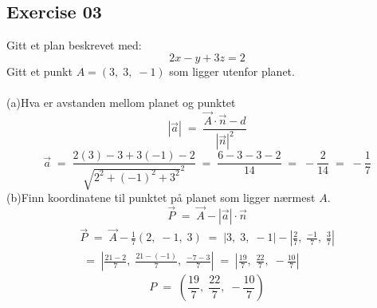 \documentclass[12pt, a4paper]{article}
\begin{document}
\newpage\quad			
\subsection*{Exercise 03}
Gitt et plan beskrevet med:
	\begin{equation}
		\tag*{}
		2x-y+3z=2
	\end{equation}
Gitt et punkt $A=(3,\;3,\;-1)$ som ligger utenfor planet.\\\\
	(a)\quad Hva er avstanden mellom planet og punktet
			\begin{equation}
				\tag*{}
					|\vec{a}|\;=\;\frac{\vec{A}\cdot\vec{n}-d}
					{\left|\vec{n}\right|^2}
			\end{equation}
			\begin{equation}
				\tag*{}
					\vec{a}\;=\;\frac{2(3)-3+3(-1)-2}
					{\sqrt{2^2+(-1)^2+3^2}^2}\;=\;
					\frac{6-3-3-2}{14}\;=\;
					-\frac{2}{14}\;=\;-\frac{1}{7}
			\end{equation}
	(b)\quad Finn koordinatene til punktet på planet som
	ligger nærmest $A$.
			\begin{equation}
				\tag*{}
					\vec{P}\;=\;\vec{A}-|\vec{a}|\cdot\vec{n}
			\end{equation}
			\begin{gather}
				\tag*{}
					\vec{P}\;=\;\vec{A}-\frac{1}{7}(2,\;-1,\;3)
					\;=\;|3,\;3,\;-1|-\left|
						\frac{2}{7},\;
						\frac{-1}{7},\;
						\frac{3}{7}
					\right|\\
				\tag*{}
					\;=\;\left|
						\frac{21-2}{7},\;
						\frac{21-(-1)}{7},\;
						\frac{-7-3}{7}
					\right|\;=\;\left|
						\frac{19}{7},\;
						\frac{22}{7},\;
						-\frac{10}{7}
					\right|
			\end{gather}
			\begin{equation}
					\tag*{}
						P\;=\;\left(
							\frac{19}{7},\;
							\frac{22}{7},\;
							-\frac{10}{7}
						\right)
			\end{equation}
\newpage\quad		
\end{document}
